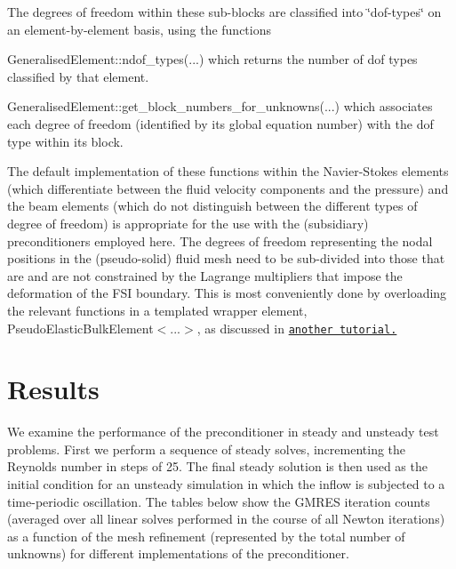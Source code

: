 The degrees of freedom within these sub-\/blocks are classified into \char`\"{}dof-\/types\char`\"{} on an element-\/by-\/element basis, using the functions
\begin{DoxyItemize}
\item {\ttfamily Generalised\+Element\+::ndof\+\_\+types}(...) which returns the number of dof types classified by that element.
\item {\ttfamily Generalised\+Element\+::get\+\_\+block\+\_\+numbers\+\_\+for\+\_\+unknowns}(...) which associates each degree of freedom (identified by its global equation number) with the dof type within its block. ~\newline
~\newline

\end{DoxyItemize}The default implementation of these functions within the Navier-\/\+Stokes elements (which differentiate between the fluid velocity components and the pressure) and the beam elements (which do not distinguish between the different types of degree of freedom) is appropriate for the use with the (subsidiary) preconditioners employed here. The degrees of freedom representing the nodal positions in the (pseudo-\/solid) fluid mesh need to be sub-\/divided into those that are and are not constrained by the Lagrange multipliers that impose the deformation of the F\+SI boundary. This is most conveniently done by overloading the relevant functions in a templated wrapper element, {\ttfamily Pseudo\+Elastic\+Bulk\+Element$<$...$>$}, as discussed in \href{../../prescribed_displ_lagr_mult/html/index.html}{\tt another tutorial.}



 

\hypertarget{index_results}{}\section{Results}\label{index_results}
We examine the performance of the preconditioner in steady and unsteady test problems. First we perform a sequence of steady solves, incrementing the Reynolds number in steps of 25. The final steady solution is then used as the initial condition for an unsteady simulation in which the inflow is subjected to a time-\/periodic oscillation. The tables below show the G\+M\+R\+ES iteration counts (averaged over all linear solves performed in the course of all Newton iterations) as a function of the mesh refinement (represented by the total number of unknowns) for different implementations of the preconditioner.

